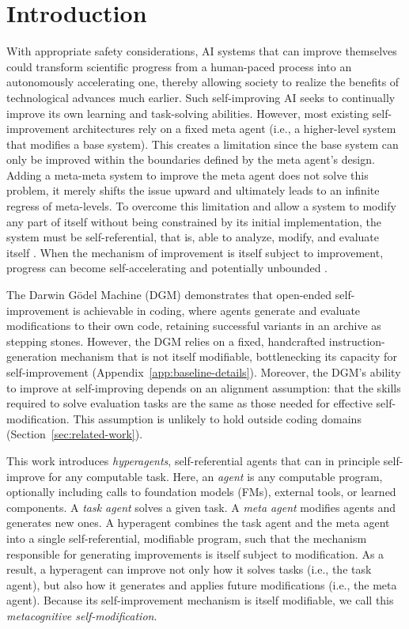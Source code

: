 \section{Introduction}
\label{sec:intro}

With appropriate safety considerations, AI systems that can improve themselves could transform scientific progress from a human-paced process into an autonomously accelerating one, thereby allowing society to realize the benefits of technological advances much earlier. Such self-improving AI seeks to continually improve its own learning and task-solving abilities. However, most existing self-improvement architectures rely on a fixed meta agent (i.e., a higher-level system that modifies a base system). This creates a limitation since the base system can only be improved within the boundaries defined by the meta agent's design. Adding a meta-meta system to improve the meta agent does not solve this problem, it merely shifts the issue upward and ultimately leads to an infinite regress of meta-levels. To overcome this limitation and allow a system to modify any part of itself without being constrained by its initial implementation, the system must be self-referential, that is, able to analyze, modify, and evaluate itself \citep{kirsch2022eliminating, zhang2025darwin}. When the mechanism of improvement is itself subject to improvement, progress can become self-accelerating and potentially unbounded \citep{lu2023arbitrary}.

The Darwin G\"{o}del Machine (DGM) \citep{zhang2025darwin} demonstrates that open-ended self-improvement is achievable in coding, where agents generate and evaluate modifications to their own code, retaining successful variants in an archive as stepping stones. However, the DGM relies on a fixed, handcrafted instruction-generation mechanism that is not itself modifiable, bottlenecking its capacity for self-improvement (Appendix~\ref{app:baseline-details}). Moreover, the DGM's ability to improve at self-improving depends on an alignment assumption: that the skills required to solve evaluation tasks are the same as those needed for effective self-modification. This assumption is unlikely to hold outside coding domains (Section~\ref{sec:related-work}).

This work introduces \textit{hyperagents}, self-referential agents that can in principle self-improve for any computable task. Here, an \textit{agent} is any computable program, optionally including calls to foundation models (FMs), external tools, or learned components. A \textit{task agent} solves a given task. A \textit{meta agent} modifies agents and generates new ones. A hyperagent combines the task agent and the meta agent into a single self-referential, modifiable program, such that the mechanism responsible for generating improvements is itself subject to modification. As a result, a hyperagent can improve not only how it solves tasks (i.e., the task agent), but also how it generates and applies future modifications (i.e., the meta agent). Because its self-improvement mechanism is itself modifiable, we call this \textit{metacognitive self-modification}.

